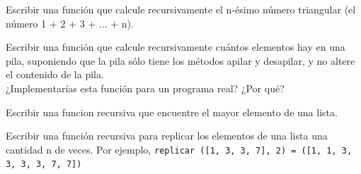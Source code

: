 \begin{ejercicio}
Escribir una función que calcule recursivamente el n-ésimo
número triangular (el número 1 + 2 + 3 + ... + n).
\end{ejercicio}

\begin{ejercicio}
Escribir una función que calcule recursivamente cuántos elementos
hay en una pila, suponiendo que la pila sólo tiene los métodos apilar
y desapilar, y no altere el contenido de la pila.\\
¿Implementarías esta función para un programa real? ¿Por qué?
\end{ejercicio}

\begin{ejercicio}
Escribir una funcion recursiva que encuentre el mayor elemento de una lista.
\end{ejercicio}

\begin{ejercicio}
Escribir una función recursiva para replicar los elementos de una lista una
cantidad n de veces. Por ejemplo,
\verb!replicar ([1, 3, 3, 7], 2) = ([1, 1, 3, 3, 3, 3, 7, 7])!
\end{ejercicio}

